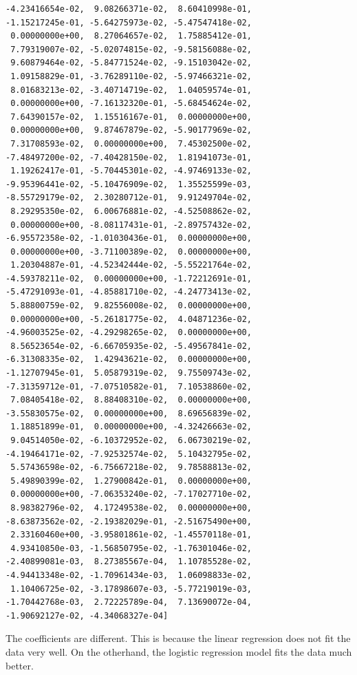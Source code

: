 \documentclass{article}
\begin{document}
\begin{verbatim}
-4.23416654e-02,  9.08266371e-02,  8.60410998e-01,
-1.15217245e-01, -5.64275973e-02, -5.47547418e-02,
 0.00000000e+00,  8.27064657e-02,  1.75885412e-01,
 7.79319007e-02, -5.02074815e-02, -9.58156088e-02,
 9.60879464e-02, -5.84771524e-02, -9.15103042e-02,
 1.09158829e-01, -3.76289110e-02, -5.97466321e-02,
 8.01683213e-02, -3.40714719e-02,  1.04059574e-01,
 0.00000000e+00, -7.16132320e-01, -5.68454624e-02,
 7.64390157e-02,  1.15516167e-01,  0.00000000e+00,
 0.00000000e+00,  9.87467879e-02, -5.90177969e-02,
 7.31708593e-02,  0.00000000e+00,  7.45302500e-02,
-7.48497200e-02, -7.40428150e-02,  1.81941073e-01,
 1.19262417e-01, -5.70445301e-02, -4.97469133e-02,
-9.95396441e-02, -5.10476909e-02,  1.35525599e-03,
-8.55729179e-02,  2.30280712e-01,  9.91249704e-02,
 8.29295350e-02,  6.00676881e-02, -4.52508862e-02,
 0.00000000e+00, -8.08117431e-01, -2.89757432e-02,
-6.95572358e-02, -1.01030436e-01,  0.00000000e+00,
 0.00000000e+00, -3.71100389e-02,  0.00000000e+00,
 1.20304887e-01, -4.52342444e-02, -5.55221764e-02,
-4.59378211e-02,  0.00000000e+00, -1.72212691e-01,
-5.47291093e-01, -4.85881710e-02, -4.24773413e-02,
 5.88800759e-02,  9.82556008e-02,  0.00000000e+00,
 0.00000000e+00, -5.26181775e-02,  4.04871236e-02,
-4.96003525e-02, -4.29298265e-02,  0.00000000e+00,
 8.56523654e-02, -6.66705935e-02, -5.49567841e-02,
-6.31308335e-02,  1.42943621e-02,  0.00000000e+00,
-1.12707945e-01,  5.05879319e-02,  9.75509743e-02,
-7.31359712e-01, -7.07510582e-01,  7.10538860e-02,
 7.08405418e-02,  8.88408310e-02,  0.00000000e+00,
-3.55830575e-02,  0.00000000e+00,  8.69656839e-02,
 1.18851899e-01,  0.00000000e+00, -4.32426663e-02,
 9.04514050e-02, -6.10372952e-02,  6.06730219e-02,
-4.19464171e-02, -7.92532574e-02,  5.10432795e-02,
 5.57436598e-02, -6.75667218e-02,  9.78588813e-02,
 5.49890399e-02,  1.27900842e-01,  0.00000000e+00,
 0.00000000e+00, -7.06353240e-02, -7.17027710e-02,
 8.98382796e-02,  4.17249538e-02,  0.00000000e+00,
-8.63873562e-02, -2.19382029e-01, -2.51675490e+00,
 2.33160460e+00, -3.95801861e-02, -1.45570118e-01,
 4.93410850e-03, -1.56850795e-02, -1.76301046e-02,
-2.40899081e-03,  8.27385567e-04,  1.10785528e-02,
-4.94413348e-02, -1.70961434e-03,  1.06098833e-02,
 1.10406725e-02, -3.17898607e-03, -5.77219019e-03,
-1.70442768e-03,  2.72225789e-04,  7.13690072e-04,
-1.90692127e-02, -4.34068327e-04]
\end{verbatim}
The coefficients are different. This is because the linear regression does not fit the data very well. On the otherhand, the logistic regression model fits the data much better.
\end{document}
